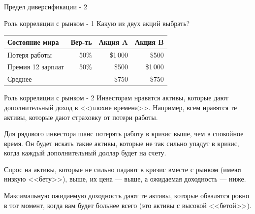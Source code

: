 \documentclass{beamer}
\newcommand{\qrcodeminipage}[1]{
	\begin{minipage}{0.3\textwidth}
		\qrcode[height=\textwidth]{#1}
	\end{minipage}
}
\begin{document}
\begin{frame}{Предел диверсификации - 2}
\centering
{}
\end{frame}



\begin{frame}{Роль корреляции с рынком - 1}
\justify
Какую из двух акций выбрать?

\justify
\centering
\begin{tabular}{l|r|r|r}
Состояние мира    & Вер-ть & Акция A  & Акция B \\ \hline
Потеря работы     & 50\%   & \$1\,000 & \$500 \\
Премия 12 зарплат & 50\%   & \$500    & \$1\,000 \\ \hline
Среднее           &        & \$750    & \$750
\end{tabular}

\end{frame}



\begin{frame}{Роль корреляции с рынком - 2}
\justify
Инвесторам нравятся активы, которые дают дополнительный доход в <<плохие 
времена>>. Например, всем нравятся те активы, которые дают страховку от потери
работы.

\justify
Для рядового инвестора шанс потерять работу в кризис выше, чем в спокойное 
время. Он будет искать такие активы, которые не так сильно упадут в кризис, 
когда каждый дополнительный доллар будет на счету.

\justify
Спрос на активы, которые не сильно падают в кризис вместе с рынком (имеют 
низкую <<бету>>), выше, их цена --- выше, а ожидаемая доходность --- ниже.

\justify
Максимальную ожидаемую доходность дают те активы, которые обвалятся ровно в тот
момент, когда вам будет больнее всего (это активы с высокой <<бетой>>).
\end{frame}
\end{document}
